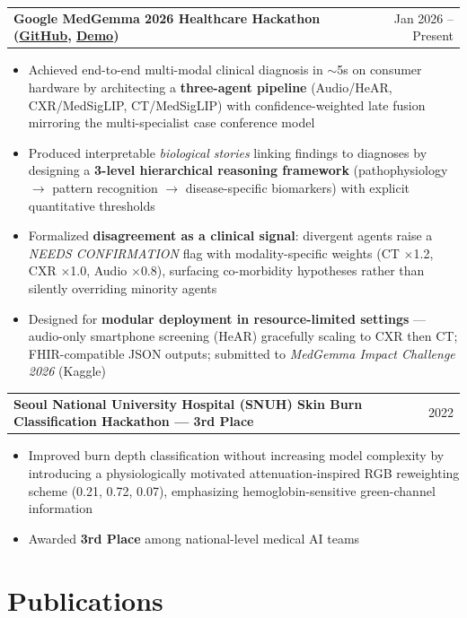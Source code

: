 \documentclass[a4paper,10pt]{article}
\makeatletter
\newenvironment{joblong}[2]
    {
    \begin{tabularx}{\linewidth}{@{}l X r@{}}
    \textbf{#1} & \hfill &  #2 \\[3.75pt]
    \end{tabularx}
    \begin{minipage}[t]{\linewidth}
    \begin{itemize}[nosep,after=\strut, leftmargin=1em, itemsep=3pt,label=--]
    }
    {
    \end{itemize}
    \end{minipage}    
    }
\makeatother
\begin{document}
\begin{joblong}{Google MedGemma 2026 Healthcare Hackathon \textnormal{(\href{https://github.com/born-june04/medgemma_2026challenge}{GitHub}, \href{https://www.youtube.com/watch?v=j5Z_kRi3wDU}{Demo})}}{Jan 2026 -- Present}
\item Achieved end-to-end multi-modal clinical diagnosis in $\sim$5s on consumer hardware by architecting a \textbf{three-agent pipeline} (Audio/HeAR, CXR/MedSigLIP, CT/MedSigLIP) with confidence-weighted late fusion mirroring the multi-specialist case conference model
\item Produced interpretable \textit{biological stories} linking findings to diagnoses by designing a \textbf{3-level hierarchical reasoning framework} (pathophysiology $\rightarrow$ pattern recognition $\rightarrow$ disease-specific biomarkers) with explicit quantitative thresholds
\item Formalized \textbf{disagreement as a clinical signal}: divergent agents raise a \textit{NEEDS CONFIRMATION} flag with modality-specific weights (CT $\times$1.2, CXR $\times$1.0, Audio $\times$0.8), surfacing co-morbidity hypotheses rather than silently overriding minority agents
\item Designed for \textbf{modular deployment in resource-limited settings} --- audio-only smartphone screening (HeAR) gracefully scaling to CXR then CT; FHIR-compatible JSON outputs; submitted to \textit{MedGemma Impact Challenge 2026} (Kaggle)
\end{joblong}


\begin{joblong}{Seoul National University Hospital (SNUH) Skin Burn Classification Hackathon --- 3rd Place}{2022}
\item Improved burn depth classification without increasing model complexity by introducing a physiologically motivated attenuation-inspired RGB reweighting scheme (0.21, 0.72, 0.07), emphasizing hemoglobin-sensitive green-channel information
\item Awarded \textbf{3rd Place} among national-level medical AI teams
\end{joblong}

\section{Publications}
\end{document}
